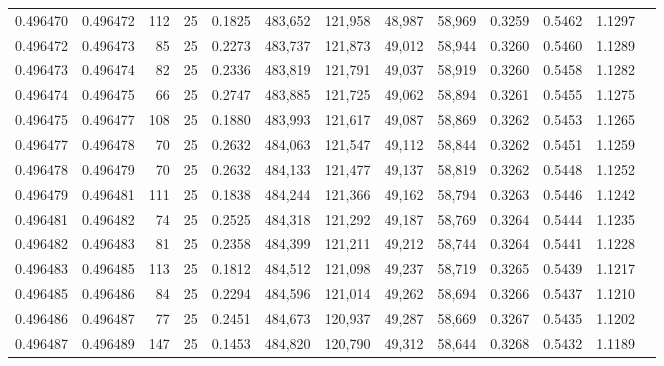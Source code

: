 \begin{tabular}{rrrrrrrrrrrrr}
0.496470 & 0.496472 &   112 &  25 &                                     0.1825 & 483,652 & 121,958 &  48,987 &  58,969 & 0.3259 & 0.5462 & 1.1297 \\
0.496472 & 0.496473 &    85 &  25 &                                     0.2273 & 483,737 & 121,873 &  49,012 &  58,944 & 0.3260 & 0.5460 & 1.1289 \\
0.496473 & 0.496474 &    82 &  25 &                                     0.2336 & 483,819 & 121,791 &  49,037 &  58,919 & 0.3260 & 0.5458 & 1.1282 \\
0.496474 & 0.496475 &    66 &  25 &                                     0.2747 & 483,885 & 121,725 &  49,062 &  58,894 & 0.3261 & 0.5455 & 1.1275 \\
0.496475 & 0.496477 &   108 &  25 &                                     0.1880 & 483,993 & 121,617 &  49,087 &  58,869 & 0.3262 & 0.5453 & 1.1265 \\
0.496477 & 0.496478 &    70 &  25 &                                     0.2632 & 484,063 & 121,547 &  49,112 &  58,844 & 0.3262 & 0.5451 & 1.1259 \\
0.496478 & 0.496479 &    70 &  25 &                                     0.2632 & 484,133 & 121,477 &  49,137 &  58,819 & 0.3262 & 0.5448 & 1.1252 \\
0.496479 & 0.496481 &   111 &  25 &                                     0.1838 & 484,244 & 121,366 &  49,162 &  58,794 & 0.3263 & 0.5446 & 1.1242 \\
0.496481 & 0.496482 &    74 &  25 &                                     0.2525 & 484,318 & 121,292 &  49,187 &  58,769 & 0.3264 & 0.5444 & 1.1235 \\
0.496482 & 0.496483 &    81 &  25 &                                     0.2358 & 484,399 & 121,211 &  49,212 &  58,744 & 0.3264 & 0.5441 & 1.1228 \\
0.496483 & 0.496485 &   113 &  25 &                                     0.1812 & 484,512 & 121,098 &  49,237 &  58,719 & 0.3265 & 0.5439 & 1.1217 \\
0.496485 & 0.496486 &    84 &  25 &                                     0.2294 & 484,596 & 121,014 &  49,262 &  58,694 & 0.3266 & 0.5437 & 1.1210 \\
0.496486 & 0.496487 &    77 &  25 &                                     0.2451 & 484,673 & 120,937 &  49,287 &  58,669 & 0.3267 & 0.5435 & 1.1202 \\
0.496487 & 0.496489 &   147 &  25 &                                     0.1453 & 484,820 & 120,790 &  49,312 &  58,644 & 0.3268 & 0.5432 & 1.1189 \\

\end{tabular}
